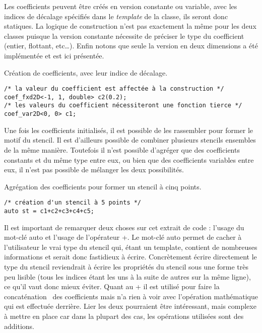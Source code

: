 Les coefficients peuvent être créés en version constante ou variable, avec les indices de décalage spécifiés dans le \emph{template} de la classe, ils seront donc statiques. La logique de construction n'est pas exactement la même pour les deux classes puisque la version constante nécessite de préciser le type du coefficient (entier, flottant, etc\ldots). Enfin notons que seule la version en deux dimensions a été implémentée et est ici présentée.
\begin{listing}[H]
\caption{Création de coefficients, avec leur indice de décalage.}
\begin{verbatim}
/* la valeur du coefficient est affectée à la construction */
coef_fxd2D<-1, 1, double> c2(0.2);
/* les valeurs du coefficient nécessiteront une fonction tierce */
coef_var2D<0, 0> c1;
\end{verbatim}
\end{listing}

Une fois les coefficients initialisés, il est possible de les rassembler pour former le motif du stencil. Il est d'ailleurs possible de combiner plusieurs stencils ensembles de la même manière. Toutefois il n'est possible d'agréger que des coefficients constants et du même type entre eux, ou bien que des coefficients variables entre eux, il n'est pas possible de mélanger les deux possibilités.
\begin{listing}[H]
\caption{Agrégation des coefficients pour former un stencil à cinq points.}
\begin{verbatim}
/* création d'un stencil à 5 points */
auto st = c1+c2+c3+c4+c5; 
\end{verbatim}
\end{listing}
Il est important de remarquer deux choses sur cet extrait de code : l'usage du mot-clé \textsf{auto} et l'usage de l'opérateur \textsf{+}. Le mot-clé \textsf{auto} permet de cacher à l'utilisateur le vrai type du stencil qui, étant un template, contient de nombreuses informations et serait donc fastidieux à écrire. Concrètement écrire directement le type du stencil reviendrait à écrire les propriétés du stencil sous une forme très peu lisible (tous les indices étant les uns à la suite de autres sur la même ligne), ce qu'il vaut donc mieux éviter. Quant au \textsf{+} il est utilisé pour faire la \og concaténation \fg~des coefficients mais n'a rien à voir avec l'opération mathématique qui est effectuée derrière. Lier les deux pourraient être intéressant, mais complexe à mettre en place car dans la plupart des cas, les opérations utilisées sont des additions.

